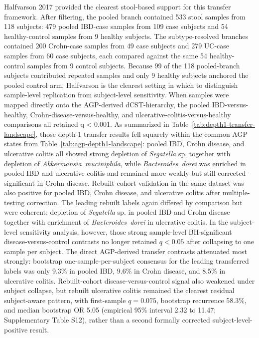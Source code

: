 \documentclass[
  11pt,
]{article}
\newcommand{\taxon}[1]{\emph{#1}}
\begin{document}
Halfvarson 2017 provided the clearest stool-based support for this
transfer framework. After filtering, the pooled branch contained 533
stool samples from 118 subjects: 479 pooled IBD-case samples from 109
case subjects and 54 healthy-control samples from 9 healthy subjects.
The subtype-resolved branches contained 200 Crohn-case samples from 49
case subjects and 279 UC-case samples from 60 case subjects, each
compared against the same 54 healthy-control samples from 9 control
subjects. Because 99 of the 118 pooled-branch subjects contributed
repeated samples and only 9 healthy subjects anchored the pooled control
arm, Halfvarson is the clearest setting in which to distinguish
sample-level replication from subject-level sensitivity.
When samples were mapped directly onto the AGP-derived dCST-hierarchy,
the pooled IBD-versus-healthy, Crohn-disease-versus-healthy, and
ulcerative-colitis-versus-healthy comparisons all retained q < 0.001.
As summarized in Table~\ref{tab:depth1-transfer-landscape}, those
depth-1 transfer results fell squarely within the common AGP states from
Table~\ref{tab:agp-depth1-landscape}: pooled IBD, Crohn disease, and
ulcerative colitis all showed strong depletion of \taxon{Segatella} sp.
together with depletion of \taxon{Akkermansia~muciniphila}, while
\taxon{Bacteroides~dorei} was enriched in pooled IBD and ulcerative
colitis and remained more weakly but still corrected-significant in
Crohn disease. Rebuilt-cohort validation in the same dataset was also
positive for pooled IBD, Crohn disease, and ulcerative colitis after
multiple-testing correction. The leading rebuilt labels again differed
by comparison but were coherent: depletion of \taxon{Segatella} sp. in
pooled IBD and Crohn disease together with enrichment of
\taxon{Bacteroides~dorei} in ulcerative colitis. In the
subject-level sensitivity analysis, however, those strong sample-level
BH-significant disease-versus-control contrasts no longer retained
\(q < 0.05\) after collapsing to one sample per subject. The direct
AGP-derived transfer contrasts attenuated most strongly: bootstrap
one-sample-per-subject consensus for the leading transferred labels was
only 9.3\% in pooled IBD, 9.6\% in Crohn disease, and 8.5\% in
ulcerative colitis. Rebuilt-cohort disease-versus-control signal also
weakened under subject collapse, but rebuilt ulcerative colitis remained
the clearest residual subject-aware pattern, with first-sample
\(q = 0.075\), bootstrap recurrence 58.3\%, and median bootstrap OR
5.05 (empirical 95\% interval 2.32 to 11.47; Supplementary Table S12),
rather than a second formally corrected subject-level-positive result.
\end{document}
